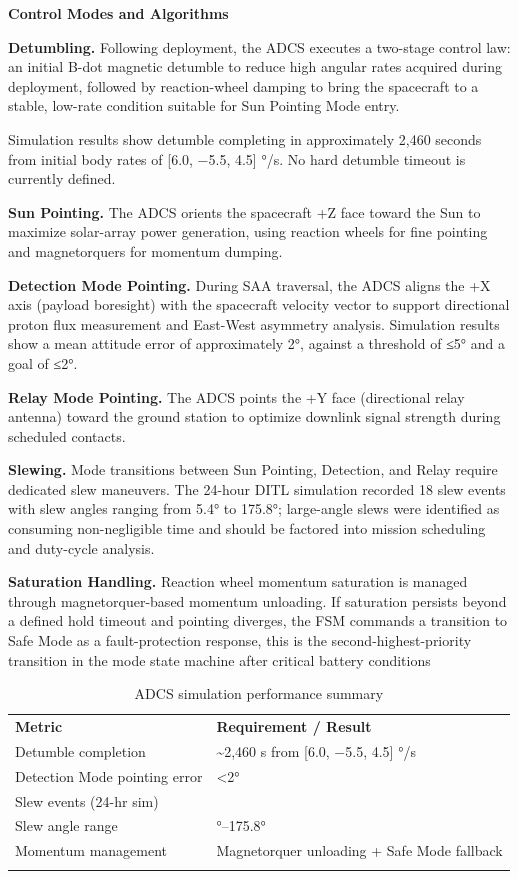 \textbf{Control Modes and Algorithms}

\textbf{Detumbling.} Following deployment, the ADCS executes a two-stage
control law: an initial B-dot magnetic detumble to reduce high angular
rates acquired during deployment, followed by reaction-wheel damping to
bring the spacecraft to a stable, low-rate condition suitable for Sun
Pointing Mode entry.

Simulation results show detumble completing in approximately 2,460
seconds from initial body rates of {[}6.0, −5.5, 4.5{]} °/s. No hard
detumble timeout is currently defined.

\textbf{Sun Pointing.} The ADCS orients the spacecraft +Z face toward
the Sun to maximize solar-array power generation, using reaction wheels
for fine pointing and magnetorquers for momentum dumping.

\textbf{Detection Mode Pointing.} During SAA traversal, the ADCS aligns
the +X axis (payload boresight) with the spacecraft velocity vector to
support directional proton flux measurement and East-West asymmetry
analysis. Simulation results show a mean attitude error of approximately
2°, against a threshold of ≤5° and a goal of ≤2°.

\textbf{Relay Mode Pointing.} The ADCS points the +Y face (directional
relay antenna) toward the ground station to optimize downlink signal
strength during scheduled contacts.

\textbf{Slewing.} Mode transitions between Sun Pointing, Detection, and
Relay require dedicated slew maneuvers. The 24-hour DITL simulation
recorded 18 slew events with slew angles ranging from 5.4° to 175.8°;
large-angle slews were identified as consuming non-negligible time and
should be factored into mission scheduling and duty-cycle analysis.

\textbf{Saturation Handling.} Reaction wheel momentum saturation is
managed through magnetorquer-based momentum unloading. If saturation
persists beyond a defined hold timeout and pointing diverges, the FSM
commands a transition to Safe Mode as a fault-protection response, this
is the second-highest-priority transition in the mode state machine
after critical battery conditions

\begin{longtable}{@{}
  >{\raggedright\arraybackslash}p{}
  >{\raggedright\arraybackslash}p{}@{}}
\caption{ADCS simulation performance summary}\\
\toprule\noalign{}
\textbf{Metric} & \textbf{Requirement / Result} \\
Detumble completion & \textasciitilde2,460 s from {[}6.0, −5.5, 4.5{]} °/s \\
Detection Mode pointing error & \textless2° \\
Slew events (24-hr sim) & 18 \\
Slew angle range & 5.4°--175.8° \\
Momentum management & Magnetorquer unloading + Safe Mode fallback \\
\midrule\noalign{}
\endhead
\bottomrule\noalign{}
\endlastfoot
\end{longtable}

